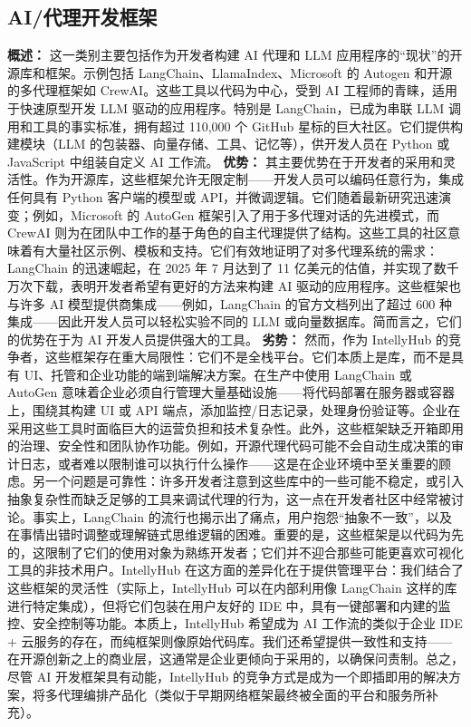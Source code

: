 \documentclass[11pt, a4paper, oneside]{article}
\begin{document}
\subsection{AI/代理开发框架}
\textbf{概述：} 这一类别主要包括作为开发者构建 AI 代理和 LLM 应用程序的“现状”的开源库和框架。示例包括 LangChain、LlamaIndex、Microsoft 的 Autogen 和开源的多代理框架如 CrewAI。这些工具以代码为中心，受到 AI 工程师的青睐，适用于快速原型开发 LLM 驱动的应用程序。特别是 LangChain，已成为串联 LLM 调用和工具的事实标准，拥有超过 110,000 个 GitHub 星标的巨大社区\cite{langchainGitHub}。它们提供构建模块（LLM 的包装器、向量存储、工具、记忆等），供开发人员在 Python 或 JavaScript 中组装自定义 AI 工作流。\newline \newline
\textbf{优势：} 其主要优势在于开发者的采用和灵活性。作为开源库，这些框架允许无限定制——开发人员可以编码任意行为，集成任何具有 Python 客户端的模型或 API，并微调逻辑。它们随着最新研究迅速演变；例如，Microsoft 的 AutoGen 框架引入了用于多代理对话的先进模式\cite{autogenGitHub}，而 CrewAI 则为在团队中工作的基于角色的自主代理提供了结构\cite{crewaiGitHub}。这些工具的社区意味着有大量社区示例、模板和支持。它们有效地证明了对多代理系统的需求：LangChain 的迅速崛起，在 2025 年 7 月达到了 11 亿美元的估值\cite{langchainValuation}，并实现了数千万次下载，表明开发者希望有更好的方法来构建 AI 驱动的应用程序。这些框架也与许多 AI 模型提供商集成——例如，LangChain 的官方文档列出了超过 600 种集成\cite{langchainIntegrations}——因此开发人员可以轻松实验不同的 LLM 或向量数据库。简而言之，它们的优势在于为 AI 开发人员提供强大的工具。\newline \newline
\textbf{劣势：} 然而，作为 IntellyHub 的竞争者，这些框架存在重大局限性：它们不是全栈平台。它们本质上是库，而不是具有 UI、托管和企业功能的端到端解决方案。在生产中使用 LangChain 或 AutoGen 意味着企业必须自行管理大量基础设施——将代码部署在服务器或容器上，围绕其构建 UI 或 API 端点，添加监控/日志记录，处理身份验证等。企业在采用这些工具时面临巨大的运营负担和技术复杂性。此外，这些框架缺乏开箱即用的治理、安全性和团队协作功能。例如，开源代理代码可能不会自动生成决策的审计日志，或者难以限制谁可以执行什么操作——这是在企业环境中至关重要的顾虑。另一个问题是可靠性：许多开发者注意到这些库中的一些可能不稳定，或引入抽象复杂性而缺乏足够的工具来调试代理的行为，这一点在开发者社区中经常被讨论\cite{langchainCritique}。事实上，LangChain 的流行也揭示出了痛点，用户抱怨“抽象不一致”，以及在事情出错时调整或理解链式思维逻辑的困难。重要的是，这些框架是以代码为先的，这限制了它们的使用对象为熟练开发者；它们并不迎合那些可能更喜欢可视化工具的非技术用户。IntellyHub 在这方面的差异化在于提供管理平台：我们结合了这些框架的灵活性（实际上，IntellyHub 可以在内部利用像 LangChain 这样的库进行特定集成），但将它们包装在用户友好的 IDE 中，具有一键部署和内建的监控、安全控制等功能。本质上，IntellyHub 希望成为 AI 工作流的类似于企业 IDE + 云服务的存在，而纯框架则像原始代码库。我们还希望提供一致性和支持——在开源创新之上的商业层，这通常是企业更倾向于采用的，以确保问责制。总之，尽管 AI 开发框架具有动能，IntellyHub 的竞争方式是成为一个即插即用的解决方案，将多代理编排产品化（类似于早期网络框架最终被全面的平台和服务所补充）。
\end{document}
